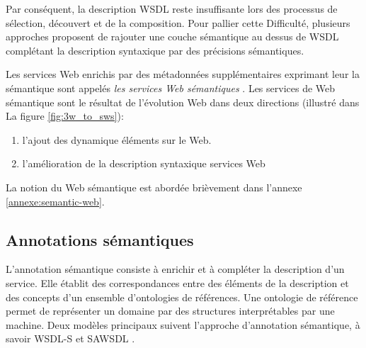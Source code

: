 Par conséquent, la description \textsc{WSDL} reste insuffisante lors
des processus de sélection, découvert et de la composition. Pour
pallier cette Difficulté, plusieurs approches
\cite{sivashanmugam2003adding,mcilraith2001semantic,
  mcilraith2003bringing, fensel2002web} proposent de rajouter une
couche sémantique au dessus de \textsc{WSDL} complétant la description
syntaxique par des précisions sémantiques.


Les services Web enrichis par des métadonnées supplémentaires
exprimant leur la sémantique sont appelés \textit{les services Web
  sémantiques} \cite{fensel2002semantic, mcilraith2001semantic}. Les
services de Web sémantique sont le résultat de l'évolution Web dans
deux directions \cite{bartalos2011effective} (illustré dans La figure
\ref{fig:3w_to_sws}):

\begin{enumerate}
  \item l'ajout des dynamique éléments sur le Web.
  \item l'amélioration de la description syntaxique services Web
\end{enumerate}

 La notion du Web sémantique est abordée brièvement dans l'annexe
 \ref{annexe:semantic-web}.

  \subsection{Annotations sémantiques}
  \label{sec:semantic-annot}

  L'annotation sémantique consiste à enrichir et à compléter la
  description d'un service. Elle établit des correspondances entre des
  éléments de la description et des concepts d'un ensemble
  d'ontologies de références. Une ontologie de référence permet de
  représenter un domaine par des structures interprétables par une
  machine. Deux modèles principaux suivent l'approche d'annotation
  sémantique, à savoir \textsc{WSDL-S} et \textsc{SAWSDL}
  \cite{elie2010}.

